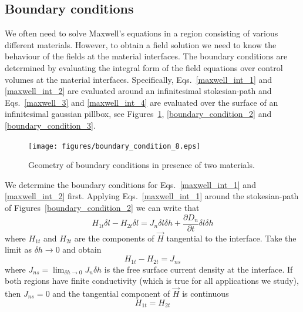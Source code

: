 \documentclass[11pt,a4paper,oneside]{book}
\numberwithin{equation}{section}
\theoremstyle{it}
\theoremstyle{definition}
\begin{document}
\subsection{Boundary conditions}
We often need to solve Maxwell's equations in a region consisting of various different materials. However, to obtain a field solution we need to know the behaviour of the fields at the material interfaces. The boundary conditions are determined by evaluating the integral form of the field equations over control volumes at the material interfaces. Specifically, Eqs.~\eqref{maxwell_int_1} and \eqref{maxwell_int_2} are evaluated around an infinitesimal stokesian-path and Eqs.~\eqref{maxwell_3} and \eqref{maxwell_int_4} are evaluated over the surface of an infinitesimal gaussian pillbox, see Figures~\ref{boundary_condition_1}, \ref{boundary_condition_2} and \ref{boundary_condition_3}.
\begin{figure}[H]
	\centering
	\texttt{[image: figures/boundary\_condition\_8.eps]}
	\captionsetup{width=0.75\textwidth}		
	\caption{Geometry of boundary conditions in presence of two materials.}
	\label{boundary_condition_1}
\end{figure}
We determine the boundary conditions for Eqs.~\eqref{maxwell_int_1} and \eqref{maxwell_int_2} first. Applying Eqs.~\eqref{maxwell_int_1} around the stokesian-path of Figures~\ref{boundary_condition_2} 
we can write that 
\begin{equation*}\label{}
	H_{1t}\delta l - H_{2t}\delta l = J_n \delta l \delta h + \frac{\partial D_n}{\partial t} \delta l \delta h
\end{equation*}
where $H_{1t}$ and $H_{2t}$ are the components of $\vec{H}$ tangential to the interface. Take the limit as $\delta h \rightarrow 0$ and obtain
\begin{equation}\label{continuity_H}
	H_{1t} - H_{2t} = J_{ns}
\end{equation}
where $J_{ns} = \lim_{\delta h\rightarrow 0}J_n\delta h$ is the free surface current density at the interface. If both regions have finite conductivity (which is true for all applications we study), then $J_{ns} = 0$ and the tangential component of $\vec{H}$ is continuous
\begin{equation}\label{}
	H_{1t} = H_{2t}
\end{equation}
\end{document}
